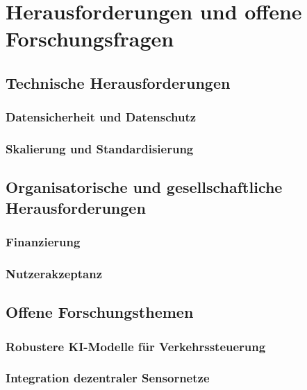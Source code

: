 \section{Herausforderungen und offene Forschungsfragen}

\subsection{Technische Herausforderungen}
\subsubsection{Datensicherheit und Datenschutz}
\subsubsection{Skalierung und Standardisierung}
\subsection{Organisatorische und gesellschaftliche Herausforderungen}
\subsubsection{Finanzierung}
\subsubsection{Nutzerakzeptanz}
\subsection{Offene Forschungsthemen}
\subsubsection{Robustere KI-Modelle für Verkehrssteuerung}
\subsubsection{Integration dezentraler Sensornetze}